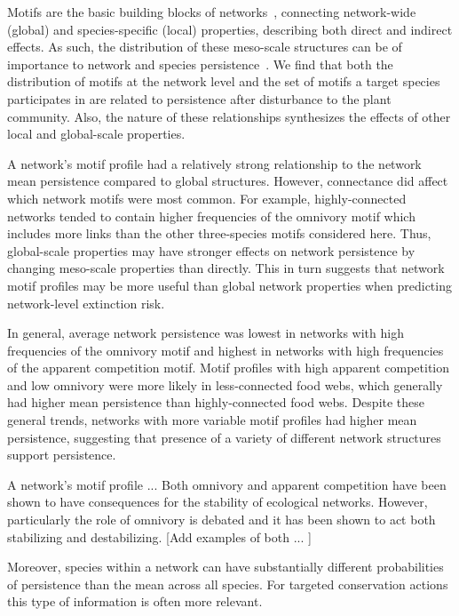 \documentclass[12pt]{article}
\begin{document}
\begin{spacing}{2.0}
Motifs are the basic building blocks of networks~\citep{Milo2002}, connecting network-wide (global) and species-specific (local) properties, describing both direct and indirect effects. As such, the distribution of these meso-scale structures can be of importance to network and species persistence~\citep{}.
We find that both the distribution of motifs at the network level and the set of motifs a target species participates in are related to persistence after disturbance to the plant community. Also, the nature of these relationships synthesizes the effects of other local and global-scale properties.

A network's motif profile had a relatively strong relationship to the network mean persistence compared to global structures. However, connectance did affect which network motifs were most common. For example, highly-connected networks tended to contain higher frequencies of the omnivory motif which includes more links than the other three-species motifs considered here.
Thus, global-scale properties may have stronger effects on network persistence by changing meso-scale properties than directly.
This in turn suggests that network motif profiles may be more useful than global network properties when predicting network-level extinction risk.

In general, average network persistence was lowest in networks with high frequencies of the omnivory motif and highest in networks with high frequencies of the apparent competition motif. 
Motif profiles with high apparent competition and low omnivory were more likely in less-connected food webs, which generally had higher mean persistence than highly-connected food webs.
Despite these general trends, networks with more variable motif profiles had higher mean persistence, suggesting that presence of a variety of different network structures support persistence. 

A network's motif profile ... Both omnivory and apparent competition have been shown to have consequences for the stability of ecological networks. However, particularly the role of omnivory is debated and it has been shown to act both stabilizing and destabilizing. [Add examples of both ... ]

Moreover, species within a network can have substantially different probabilities of persistence than the mean across all species. For targeted conservation actions this type of information is often more relevant. 


\end{spacing}
\end{document}

